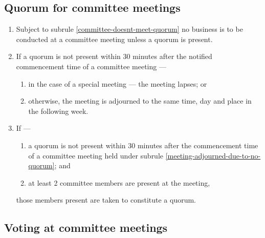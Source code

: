\documentclass[../constitution.tex]{subfiles}
\begin{document}
\hypertarget{quorum-for-committee-meetings}{%
  \subsection{Quorum for committee meetings}\label{quorum-for-committee-meetings}}

\begin{enumerate}

  \item Subject to subrule \ref{committee-doesnt-meet-quorum} no business is to be conducted at a committee meeting unless a quorum is present.
  \item If a quorum is not present within 30 minutes after the notified commencement time of a committee meeting --- \label{no-quorum-after-30min}

        \begin{enumerate}
          \item in the case of a special meeting --- the meeting lapses; or
          \item otherwise, the meeting is adjourned to the same time, day and place in the following week. \label{meeting-adjourned-due-to-no-quorum}
        \end{enumerate}
  \item If ---

        \begin{enumerate}

          \item a quorum is not present within 30 minutes after the commencement time of a committee meeting held under subrule \ref{meeting-adjourned-due-to-no-quorum}; and
          \item at least 2 committee members are present at the meeting,
        \end{enumerate}

        those members present are taken to constitute a quorum.

\end{enumerate}

\hypertarget{voting-at-committee-meetings}{%
  \subsection{Voting at committee meetings}\label{voting-at-committee-meetings}}
\end{document}
